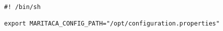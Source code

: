 \begin{lstlisting}[style=Bash]
#! /bin/sh

export MARITACA_CONFIG_PATH="/opt/configuration.properties"
\end{lstlisting}
